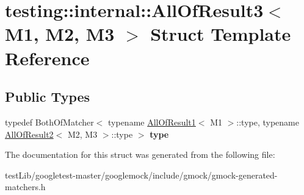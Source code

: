 \hypertarget{structtesting_1_1internal_1_1AllOfResult3}{}\section{testing\+:\+:internal\+:\+:All\+Of\+Result3$<$ M1, M2, M3 $>$ Struct Template Reference}
\label{structtesting_1_1internal_1_1AllOfResult3}
\subsection*{Public Types}
\begin{DoxyCompactItemize}
\item 
\mbox{\label{structtesting_1_1internal_1_1AllOfResult3_a18073a23acd542bccf3a6c5d7f72f957}} 
typedef Both\+Of\+Matcher$<$ typename \hyperlink{structtesting_1_1internal_1_1AllOfResult1}{All\+Of\+Result1}$<$ M1 $>$\+::type, typename \hyperlink{structtesting_1_1internal_1_1AllOfResult2}{All\+Of\+Result2}$<$ M2, M3 $>$\+::type $>$ {\bfseries type}
\end{DoxyCompactItemize}


The documentation for this struct was generated from the following file\+:\begin{DoxyCompactItemize}
\item 
test\+Lib/googletest-\/master/googlemock/include/gmock/gmock-\/generated-\/matchers.\+h\end{DoxyCompactItemize}
